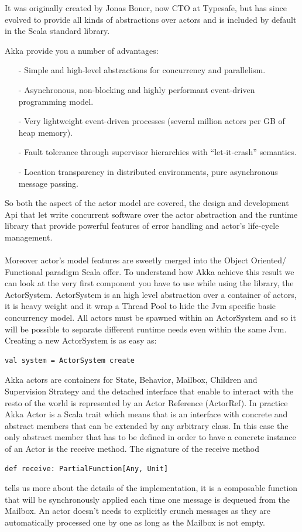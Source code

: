\documentclass{sig-alternate}
\begin{document}
It was originally created by Jonas Boner, now CTO at Typesafe, but has since evolved to
provide all kinds of abstractions over actors and is included by default in the Scala 
standard library.

Akka provide you a number of advantages:
\begin{itemize}
	\item[-] Simple and high-level abstractions for concurrency and parallelism.
	\item[-] Asynchronous, non-blocking and highly performant event-driven programming model.
	\item[-] Very lightweight event-driven processes (several million actors per GB of heap memory).
	\item[-] Fault tolerance through supervisor hierarchies with ``let-it-crash'' semantics.
	\item[-] Location transparency in distributed environments, pure asynchronous message passing. 
\end{itemize}

So both the aspect of the actor model are covered, the design and development Api that let write concurrent software over the actor abstraction and the runtime library that provide powerful features of error handling and actor's life-cycle management.
\\\\

Moreover actor's model features are sweetly merged into the Object Oriented/ Functional paradigm Scala offer.
To understand how Akka achieve this result we can look at the very first component you have to use while using the library, the ActorSystem.
ActorSystem is an high level abstraction over a container of actors, it is heavy weight and it wrap a Thread Pool to hide the Jvm specific basic concurrency model.
All actors must be spawned within an ActorSystem and so it will be possible to separate different runtime needs even within the same Jvm.
Creating a new ActorSystem is as easy as:
\begin{lstlisting}
val system = ActorSystem create
\end{lstlisting}

Akka actors are containers for State, Behavior, Mailbox, Children and Supervision Strategy and the detached interface that enable to interact with the resto of the world is represented by an Actor Reference (ActorRef).
In practice Akka Actor is a Scala trait which means that is an interface with concrete and abstract members that can be extended by any arbitrary class.
In this case the only abstract member that has to be defined in order to have a concrete instance of an Actor is the receive method.
The signature of the receive method 
\begin{lstlisting}
def receive: PartialFunction[Any, Unit]
\end{lstlisting}
tells us more about the details of the implementation, it is a composable function that will be synchronously applied each time one message is dequeued from the Mailbox.
An actor doesn't needs to explicitly crunch messages as they are automatically processed one by one as long as the Mailbox is not empty.
\\\\
\end{document}
